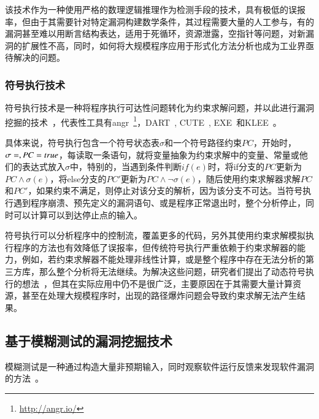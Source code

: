 该技术作为一种使用严格的数理逻辑推理作为检测手段的技术，具有极低的误报率，但由于其需要针对特定漏洞构建数学条件，其过程需要大量的人工参与，有的漏洞甚至难以用断言结构表达，适用于死循环，资源泄露，空指针等问题，对新漏洞的扩展性不高，同时，如何将大规模程序应用于形式化方法分析也成为工业界亟待解决的问题。 \\

\subsubsection{符号执行技术}
符号执行技术是一种将程序执行可达性问题转化为约束求解问题，并以此进行漏洞挖掘的技术~\cite{sym:sum}，代表性工具有angr~\footnote{\url{http://angr.io/}}，DART~\cite{sym:dart}, CUTE~\cite{sym:cute}, EXE~\cite{sym:exe}和KLEE~\cite{sym:klee}。

具体来说，符号执行包含一个符号状态表$\sigma$和一个符号路径约束$PC$，开始时，$\sigma=\empty, PC=true$，每读取一条语句，就将变量抽象为约束求解中的变量、常量或他们的表达式放入$\sigma$中，特别的，当遇到条件判断$if(e)$时，将if分支的$PC$更新为$PC \wedge \sigma(e)$，将else分支的$PC'$更新为$PC\wedge \neg\sigma(e)$，随后使用约束求解器求解$PC$和$PC'$，如果约束不满足，则停止对该分支的解析，因为该分支不可达。当符号执行遇到程序崩溃、预先定义的漏洞语句、或是程序正常退出时，整个分析停止，同时可以计算可以到达停止点的输入。

符号执行可以分析程序中的控制流，覆盖更多的代码，另外其使用约束求解模拟执行程序的方法也有效降低了误报率，但传统符号执行严重依赖于约束求解器的能力，例如，若约束求解器不能处理非线性计算，或是整个程序中存在无法分析的第三方库，那么整个分析将无法继续。为解决这些问题，研究者们提出了动态符号执行的想法~\cite{sym:dart,sym:cute,sym:exe,sym:klee}，但其在实际应用中仍不是很广泛，主要原因在于其需要大量计算资源，甚至在处理大规模程序时，出现的路径爆炸问题会导致约束求解无法产生结果。\\

\subsection{基于模糊测试的漏洞挖掘技术}
模糊测试是一种通过构造大量非预期输入，同时观察软件运行反馈来发现软件漏洞的方法~\cite{fuzzingstateofart}。

